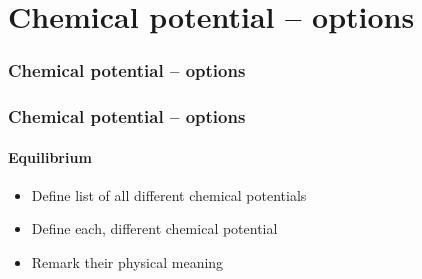\section{Chemical potential -- options}

\begin{framenologo}
  \frametitle{Chemical potential -- options}
  \tableofcontents[currentsection]
\end{framenologo}

\begin{frame}%
  \frametitle{Chemical potential -- options}
  \framesubtitle{Equilibrium}

  \begin{itemize}
    \item Define list of all different chemical potentials

    \item<2-> Define each, different chemical potential

    \item<3-> Remark their physical meaning

  \end{itemize}

\end{frame}
